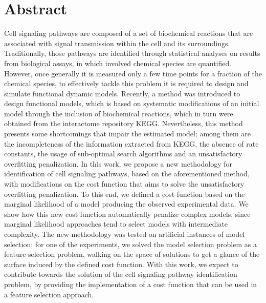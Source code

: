 \documentclass[12pt, twoside]{report}
\numberwithin{mydefinition}{section}
\numberwithin{mytheorem}{section}
\numberwithin{mylemma}{section}
\numberwithin{corollary}{section}
\begin{document}
\chapter*{Abstract}
Cell signaling pathways are composed of a set of biochemical reactions 
that are associated with signal transmission within the cell and its 
surroundings. Traditionally, those pathways are identified through 
statistical analyses on results from biological assays, in which 
involved chemical species are quantified. However, once generally it is 
measured only a few time points for a fraction of the chemical species, 
to effectively tackle this problem it is required to design and simulate 
functional dynamic models. Recently, a method was introduced to 
design functional models, which is based on systematic modifications of 
an initial model through the inclusion of biochemical reactions, which 
in turn were obtained from the interactome repository KEGG. 
Nevertheless, this method presents some shortcomings that impair the 
estimated model; among them are the incompleteness of the information 
extracted from KEGG, the absence of rate constants, the usage of 
sub-optimal search algorithms and an unsatisfactory overfitting 
penalization. In this work, we propose a new methodology for 
identification of cell signaling pathways, based on the aforementioned
method, with modifications on the cost function that aims to solve the
unsatisfactory overfitting penalization. To this end, we defined a cost function
based on the marginal likelihood of a model producing the observed
experimental data. We show how this new cost function 
automatically penalize complex models, since marginal likelihood 
approaches tend to select models with intermediate complexity. The new 
methodology was tested on artificial instances of model selection; for 
one of the experiments, we solved the model selection problem as a 
feature selection problem, walking on the space of solutions to get a 
glance of the surface induced by the defined cost function. With this
work, we expect to contribute towards the solution of the cell 
signaling pathway identification problem, by providing the implementation of a cost function that
can be used in a feature selection approach.
\end{document}
